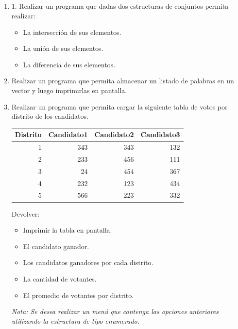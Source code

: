 \documentclass[a4paper,10pt]{article}
\begin{document}
~\\ \\ \\ \\

\begin{enumerate}

\item 1. Realizar un programa que dadas dos estructuras de conjuntos permita realizar:
    \begin{itemize}
        \item[a-] La intersecci\'on de sus elementos.
        \item[b-] La uni\'on de sus elementos.
        \item[c-] La diferencia de sus elementos.
    \end{itemize}

\item Realizar un programa que permita almacenar un listado de palabras en un vector y luego imprimirlas en pantalla.

\item Realizar un programa que permita cargar la siguiente tabla de votos por distrito de los candidatos.
    \begin{table}[h]
      \begin{tabular}{|r|r|r|r|}
        \hline
        Distrito & Candidato1 & Candidato2 & Candidato3 \\
        \hline \hline
        1 & 343 & 343 & 132 \\
        \hline
        2 & 233 & 456 & 111 \\
        \hline
        3 & 24 & 454 & 367 \\
        \hline
        4 & 232 & 123 & 434 \\
        \hline
        5 & 566 & 223 & 332 \\
        \hline
      \end{tabular}
    \end{table}

Devolver:
    \begin{itemize}
        \item[a-] Imprimir la tabla en pantalla.
        \item[b-] El candidato ganador.
        \item[c-] Los candidatos ganadores por cada distrito.
        \item[d-] La cantidad de votantes.
        \item[e-] El promedio de votantes por distrito.
    \end{itemize}
\begin{small} \emph{Nota: Se desea realizar un men\'u que contenga las opciones anteriores utilizando la estructura de tipo enumerado.}\end{small}


\end{enumerate}
\end{document}
